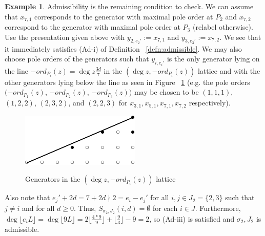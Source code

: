 \documentclass{amsart}
\theoremstyle{plain}
\theoremstyle{definition}
\newtheorem{example}[thm]{Example}
\theoremstyle{remark}
\numberwithin{equation}{section}
\newcommand \halfcan{L}
\begin{document}
\begin{example}
Admissibility is the remaining condition to check. We can assume
that $x_{7, 1}$ corresponds to the generator with maximal pole order
at $P_2$ and $x_{7, 2}$ correspond to the generator with maximal
pole order at $P_3$ (relabel otherwise). Use the presentation given
above with $y _{2, e_2'} := x_{7, 1}$ and $y_{3, e_3'} :=  x_{7, 2}$.
We see that it immediately satisfies (Ad-i) of Definition
~\ref{defn:admissible}. We may also choose pole orders of the generators
such that $y_{i, e_i'}$ is the only generator lying on the line
$-ord_{P_i}(z) = \deg z \frac{3d}{7}$ in the $(\deg z, -ord_{P_i}(z))$
 lattice and with the other generators lying below the line as seen
in Figure ~\ref{fig:377} (e.g. the pole orders $(-ord_{P_1}(z)$,
$-ord_{P_2}(z)$, $-ord_{P_3}(z))$ may be chosen to be $(1, 1, 1)$,
$(1, 2, 2)$, $(2, 3, 2)$, and $(2, 2, 3)$ for $x_{3, 1}, x_{5, 1},
x_{7, 1}, x_{7, 2}$ respectively).

\begin{figure}[H]
\label{fig:377}
\includegraphics{pics/spin-377-pic-pics.pdf} \\
\caption{Generators in the $(\deg z, -ord_{P_i}(z))$ lattice}
\end{figure}

Also note that $e_j' + 2d = 7 + 2d \nmid 2 = e_i - e_j'$ for all
$i, j \in J_2 = \{2, 3\}$ such that $j \neq i$ and for all $d \geq
0$. Thus, $S_{\sigma_2, J_2}(i, d) = \emptyset$ for each $i \in J$.
Furthermore, $\deg \lfloor e_i \halfcan \rfloor = \deg \lfloor 9
\halfcan \rfloor = 2 \lfloor \frac{4 * 9}{9} \rfloor + \lfloor
\frac{9}{3} \rfloor - 9 = 2$, so (Ad-iii) is satisfied and
$\sigma_2, J_2$ is admissible.
\end{example}
\end{document}
